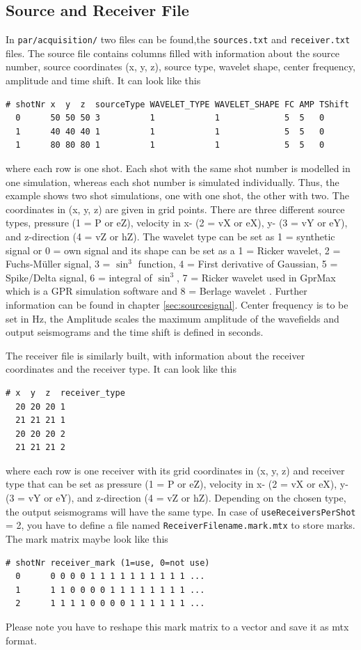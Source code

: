 \documentclass[pdftex,a4paper,parskip,listof=totoc,bibliography=totoc,onehalfspacing,12pt]{scrreprt}
\newcommand{\shellcmd}[1]{\indent\indent\texttt{#1}}	%
\begin{document}
\subsection{Source and Receiver File}\label{sec:sourcesandreceiver}
In \shellcmd{par/acquisition/} two files can be found,the \shellcmd{sources.txt} and \shellcmd{receiver.txt} files.
The source file contains columns filled with information about the source number, source coordinates (x, y, z), source type, wavelet shape, center frequency, amplitude and time shift. It can look like this
\begin{verbatim}
# shotNr x  y  z  sourceType WAVELET_TYPE WAVELET_SHAPE FC AMP TShift
  0      50 50 50 3          1            1             5  5   0
  1      40 40 40 1          1            1             5  5   0
  1      80 80 80 1          1            1             5  5   0
\end{verbatim}
where each row is one shot. Each shot with the same shot number is modelled in one simulation, whereas each shot number is simulated individually. Thus, the example shows two shot simulations, one with one shot, the other with two.
The coordinates in (x, y, z) are given in grid points. There are three different source types, pressure (1 = P or eZ), velocity in x- (2 = vX or eX), y- (3 = vY or eY), and z-direction (4 = vZ or hZ). 
The wavelet type can be set as 1 = synthetic signal or 0 = own signal and its shape can be set as a 1 = Ricker wavelet, 2 = Fuchs-M\"uller signal, 3 = $\sin^3$ function, 4 = First derivative of Gaussian, 5 = Spike/Delta signal, 6 = integral of $\sin^3$, 7 = Ricker wavelet used in GprMax which is a GPR simulation software  \citep{giannopoulos2005modelling} and 8 = Berlage wavelet \citep{aldridge1990berlage}. 
Further information can be found in chapter \ref{sec:sourcesignal}.
Center frequency is to be set in Hz, the Amplitude scales the maximum amplitude of the wavefields and output seismograms and the time shift is defined in seconds.

The receiver file is similarly built, with information about the receiver coordinates and the receiver type. It can look like this 
\begin{verbatim}
# x  y  z  receiver_type
  20 20 20 1
  21 21 21 1
  20 20 20 2
  21 21 21 2
\end{verbatim}
where each row is one receiver with its grid coordinates in (x, y, z) and receiver type that can be set as pressure (1 = P or eZ), velocity in x- (2 = vX or eX), y- (3 = vY or eY), and z-direction (4 = vZ or hZ). Depending on the chosen type, the output seismograms will have the same type. In case of \verb+useReceiversPerShot+ = 2, you have to define a file named \verb+ReceiverFilename.mark.mtx+ to store marks. The mark matrix maybe look like this
\begin{verbatim}
# shotNr receiver_mark (1=use, 0=not use)
  0      0 0 0 0 1 1 1 1 1 1 1 1 1 1 ...
  1      1 1 0 0 0 0 1 1 1 1 1 1 1 1 ...
  2      1 1 1 1 0 0 0 0 1 1 1 1 1 1 ...
\end{verbatim}
Please note you have to reshape this mark matrix to a vector and save it as mtx format.
\end{document}

